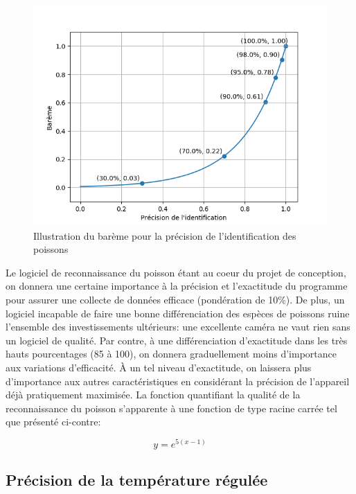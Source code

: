 \begin{figure}
    \centering
    \includegraphics[width=\linewidth]{fig/bareme_ident.png}
    \caption{Illustration du barème pour la précision de l'identification des poissons}
    \label{fig:bareme_precision}
\end{figure}

Le logiciel de reconnaissance du poisson étant au coeur du projet de conception, on donnera une certaine importance à la précision et l'exactitude du programme pour assurer une collecte de données efficace (pondération de 10\%). De plus, un logiciel incapable de faire une bonne différenciation des espèces de poissons ruine l'ensemble des investissements ultérieurs: une excellente caméra ne vaut rien sans un logiciel de qualité. Par contre, à une différenciation d'exactitude dans les très hauts pourcentages (85 à 100), on donnera graduellement moins d'importance aux variations d'efficacité. À un tel niveau d'exactitude, on laissera plus d'importance aux autres caractéristiques en considérant la précision de l'appareil déjà pratiquement maximisée. La fonction quantifiant la qualité de la reconnaissance du poisson s'apparente à une fonction de type racine carrée tel que présenté ci-contre:

\begin{equation}
    y = e^{5(x-1)}
    \label{eq:bareme_precision}
\end{equation}

\subsection{Précision de la température régulée}

